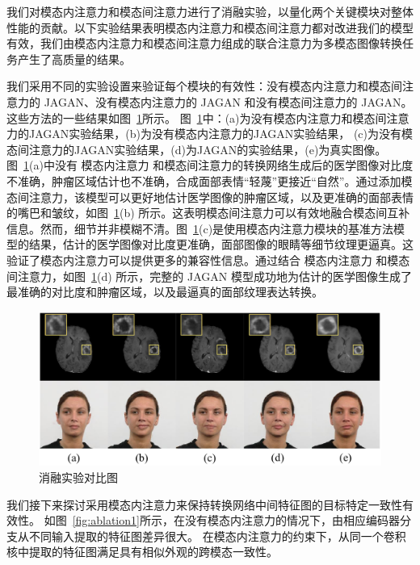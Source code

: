 我们对模态内注意力和模态间注意力进行了消融实验，以量化两个关键模块对整体性能的贡献。以下实验结果表明模态内注意力和模态间注意力都对改进我们的模型有效，我们由模态内注意力和模态间注意力组成的联合注意力为多模态图像转换任务产生了高质量的结果。

我们采用不同的实验设置来验证每个模块的有效性：没有模态内注意力和模态间注意力的 JAGAN、没有模态内注意力的 JAGAN 和没有模态间注意力的 JAGAN。这些方法的一些结果如图~\ref{fig:ablation}所示。
图~\ref{fig:ablation}中：(a)为没有模态内注意力和模态间注意力的JAGAN实验结果，(b)为没有模态内注意力的JAGAN实验结果， (c)为没有模态间注意力的JAGAN实验结果，(d)为JAGAN的实验结果，(e)为真实图像。
图~\ref{fig:ablation}(a)中没有 模态内注意力 和模态间注意力的转换网络生成后的医学图像对比度不准确，肿瘤区域估计也不准确，合成面部表情“轻蔑”更接近“自然”。通过添加模态间注意力，该模型可以更好地估计医学图像的肿瘤区域，以及更准确的面部表情的嘴巴和皱纹，如图~\ref{fig:ablation}(b) 所示。这表明模态间注意力可以有效地融合模态间互补信息。然而，细节并非模糊不清。图~\ref{fig:ablation}(c)是使用模态内注意力模块的基准方法模型的结果，估计的医学图像对比度更准确，面部图像的眼睛等细节纹理更逼真。这验证了模态内注意力可以提供更多的兼容性信息。通过结合 模态内注意力 和模态间注意力，如图~\ref{fig:ablation}(d) 所示，完整的 JAGAN 模型成功地为估计的医学图像生成了最准确的对比度和肿瘤区域，以及最逼真的面部纹理表达转换。

\begin{figure}
	\begin{center}
		\includegraphics[width=0.8\columnwidth]{figures/JAGAN/ablation.pdf}
	\end{center}
	\caption{消融实验对比图}
	\label{fig:ablation}
\end{figure}

我们接下来探讨采用模态内注意力来保持转换网络中间特征图的目标特定一致性有效性。 如图~\ref{fig:ablation1}所示，在没有模态内注意力的情况下，由相应编码器分支从不同输入提取的特征图差异很大。 在模态内注意力的约束下，从同一个卷积核中提取的特征图满足具有相似外观的跨模态一致性。

